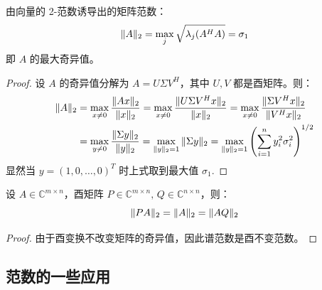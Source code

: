 \begin{example}[2-范数/谱范数]
由向量的 2-范数诱导出的矩阵范数：
\[
    \Vert A\Vert_2=\max_j\sqrt{\lambda_j(A^HA)}=\sigma_1
\]
即 $A$ 的最大奇异值。
\end{example}
\begin{proof}
设 $A$ 的奇异值分解为 $A=U\Sigma V^H$，其中 $U,V$ 都是酉矩阵。则：
\begin{align*}
    \Vert A\Vert_2&=\max_{x\neq 0}\frac{\Vert Ax\Vert_2}{\Vert x\Vert_2}
    =\max_{x\neq 0}\frac{\Vert U\Sigma V^Hx\Vert_2}{\Vert x\Vert_2}
    =\max_{x\neq 0}\frac{\Vert\Sigma V^Hx\Vert_2}{\Vert V^Hx\Vert_2}\\
    &=\max_{y\neq 0}\frac{\Vert\Sigma y\Vert_2}{\Vert y\Vert_2}
    =\max_{\Vert y\Vert_2=1}\Vert\Sigma y\Vert_2=\max_{\Vert y\Vert_2=1}\left(\sum_{i=1}^ny_i^2\sigma_i^2\right)^{1/2}
\end{align*}
显然当 $y=(1,0,\ldots,0)^T$ 时上式取到最大值 $\sigma_1$.
\end{proof}

\begin{theorem}[谱范数的酉不变性]
设 $A\in\mathbb C^{m\times n}$，酉矩阵 $P\in\mathbb C^{m\times n},\,Q\in\mathbb C^{n\times n}$，则：
\[
    \Vert PA\Vert_2=\Vert A\Vert_2=\Vert AQ\Vert_2
\]
\end{theorem}
\begin{proof}
由于酉变换不改变矩阵的奇异值，因此谱范数是酉不变范数。
\end{proof}

\subsection{范数的一些应用}

